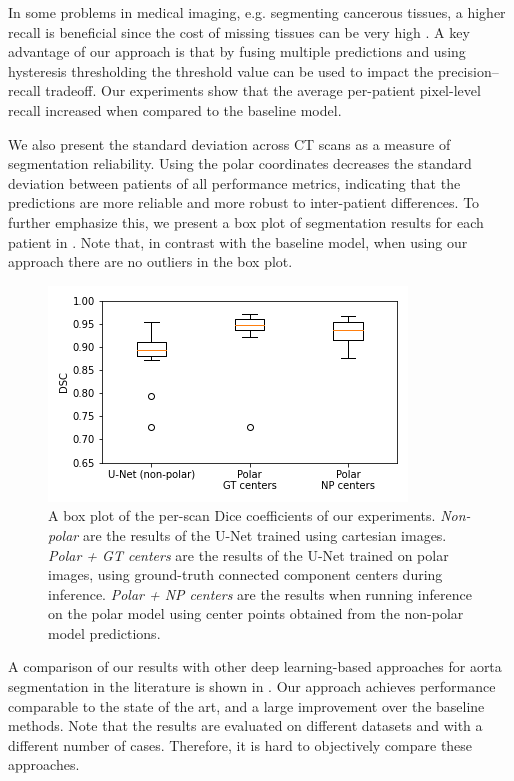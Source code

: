 In some problems in medical imaging, e.g. segmenting cancerous tissues, a higher recall is beneficial since the cost of missing tissues can be very high \cite{tahaMetricsEvaluating3D2015}. A key advantage of our approach is that by fusing multiple predictions and using hysteresis thresholding the threshold value can be used to impact the precision--recall tradeoff. Our experiments show that the average per-patient pixel-level recall increased when compared to the baseline model.

We also present the standard deviation across CT scans as a measure of segmentation reliability. Using the polar coordinates decreases the standard deviation between patients of all performance metrics, indicating that the predictions are more reliable and more robust to inter-patient differences. To further emphasize this, we present a box plot of segmentation results for each patient in . Note that, in contrast with the baseline model, when using our approach there are no outliers in the box plot.

\begin{figure}[h]
\centering
\includegraphics[width=0.6\columnwidth]{images/4/box_plot}
\caption{A box plot of the per-scan Dice coefficients of our experiments. \textit{Non-polar} are the results of the U-Net trained using cartesian images. \textit{Polar + GT centers} are the results of the U-Net trained on polar images, using ground-truth connected component centers during inference. \textit{Polar + NP centers} are the results when running inference on the polar model using center points obtained from the non-polar model predictions. \cite{bencevicUsingPolarTransform2022a}}
\label{fig:box}
\end{figure}

A comparison of our results with other deep learning-based approaches for aorta segmentation in the literature is shown in . Our approach achieves performance comparable to the state of the art, and a large improvement over the baseline methods. Note that the results are evaluated on different datasets and with a different number of cases. Therefore, it is hard to objectively compare these approaches.


